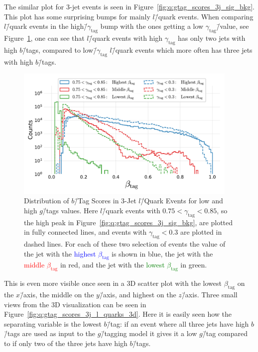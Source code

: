 The similar plot for 3-jet events is seen in Figure~\ref{fig:q:gtag_scores_3j_sig_bkg}. This plot has some surprising bumps for mainly $l$\=/quark events. When comparing $l$\=/quark events in the high\=/$\gamma_\mathrm{tag}$ bump with the ones getting a low $\gamma_\mathrm{tag}$\=/value, see Figure~\ref{fig:q:gtag_scores_3j_l_quarks}, one can see that $l$\=/quark events with high $\gamma_\mathrm{tag}$ has only two jets with high $b$\=/tags, compared to low\=/$\gamma_\mathrm{tag}$ $l$\=/quark events which more often has three jets with high $b$\=/tags. 

\begin{figure}[h!]
  \centerfloat
  \includegraphics[width=0.95\textwidth, trim=10 10 10 10, clip]{figures/quarks/leptons_high_g_tag_3j_0.75_gtag_0.85-down_sample=1.00-ML_vars=vertex-selection=b-ejet_min=4-n_iter_RS_lgb=99-n_iter_RS_xgb=9-cdot_cut=0.90-version=19.pdf}
  \caption[Distribution of $b$\=/Tag Scores in 3-Jet $l$\=/Quark Events for Low and High $g$\=/Tag Values]
          {Distribution of $b$\=/Tag Scores in 3-Jet $l$\=/Quark Events for low and high $g$\=/tags values. Here $l$\=/quark events with $0.75 < \gamma_\mathrm{tag} <  0.85$, so the high peak in Figure~\ref{fig:q:gtag_scores_3j_sig_bkg}, are plotted in fully connected lines, and events with $\gamma_\mathrm{tag} <  0.3$ are plotted in dashed lines. For each of these two selection of events the value of the jet with the \textcolor{blue}{highest $\beta_\mathrm{tag}$} is shown in blue, the jet with the \textcolor{red}{middle $\beta_\mathrm{tag}$} in red, and the jet with the \textcolor{green}{lowest $\beta_\mathrm{tag}$} in green.} 
  \label{fig:q:gtag_scores_3j_l_quarks}
\end{figure}

This is even more visible once seen in a 3D scatter plot with the lowest $\beta_\mathrm{tag}$ on the $x$\=/axis, the middle on the $y$\=/axis, and highest on the $z$\=/axis. Three small views from the 3D visualization can be seen in Figure~\ref{fig:q:gtag_scores_3j_l_quarks_3d}. Here it is easily seen how the separating variable is the lowest $b$\=/tag: if an event where all three jets have high $b$\=/tags are used as input to the $g$\=/tagging model it gives it a low $g$\=/tag compared to if only two of the three jets have high $b$\=/tags.

